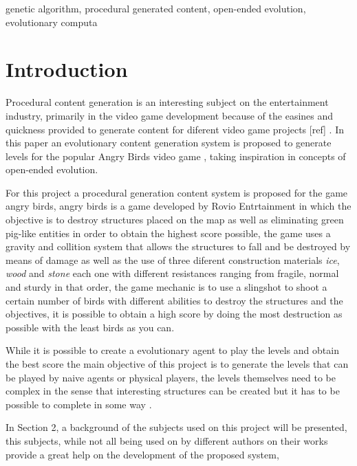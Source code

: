 \documentclass[conference]{IEEEtran}
\begin{document}
\begin{IEEEkeywords}
genetic algorithm, procedural generated content, open-ended evolution,
evolutionary computa
\end{IEEEkeywords}

\section{Introduction}
Procedural content generation is an interesting subject on the entertainment
industry, primarily in the video game development because of the easines and
quickness provided to generate content for diferent video game projects [ref] .
In this paper an evolutionary content generation system is proposed to generate
levels for the popular Angry Birds video game
\cite{RovioEntertainmentCorporation2009}, taking inspiration in concepts of
open-ended evolution.


For this project a procedural generation content system is proposed for the game
angry birds, angry birds is a game developed by Rovio Entrtainment in which the
objective is to destroy structures placed on the map as well as eliminating
green pig-like entities in order to obtain the highest score possible, the game
uses a gravity and collition system that allows the structures to fall and be
destroyed by means of damage as well as the use of three diferent construction
materials \textit{ice}, \textit{wood} and \textit{stone} each one with different
resistances ranging from fragile, normal and sturdy in that order, the game
mechanic is to use a slingshot to shoot a certain number of birds with different
abilities to destroy the structures and the objectives, it is possible to obtain
a high score by doing the most destruction as possible with the least birds as
you can. \cite{RovioEntertainmentCorporation2009}

While it is possible to create a evolutionary agent to play the levels and
obtain the best score the main objective of this project is to generate the
levels that can be played by naive agents or physical players, the levels
themselves need to be complex in the sense that interesting structures can be
created but it has to be possible to complete in some way
\cite{Stephenson,Stephenson2018}.


In Section 2, a background of the subjects used on this project will be
presented, this subjects, while not all being used on by different authors on
their works provide a great help on the development of the proposed system,
\end{document}
